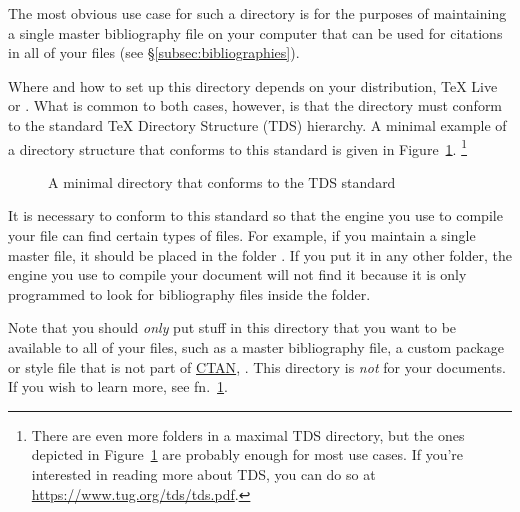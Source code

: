 The most obvious use case for such a directory is for the purposes of maintaining a single master bibliography file on your computer that can be used for citations in all of your  files (see \S\ref{subsec:bibliographies}).

Where and how to set up this directory depends on your distribution, TeX Live or .
What is common to both cases, however, is that the directory must conform to the standard \TeX{} Directory Structure (TDS) hierarchy.
A minimal example of a directory structure that conforms to this standard is given in Figure~\ref{fig:TDS}.%
\footnote{%
\label{fn:TDS}
There are even more folders in a maximal TDS directory, but the ones depicted in Figure~\ref{fig:TDS} are probably enough for most use cases.
If you're interested in reading more about TDS, you can do so at \url{https://www.tug.org/tds/tds.pdf}.%
}

\begin{figure}[htbp]
	\centering
	\caption{A minimal directory that conforms to the TDS standard}
	\label{fig:TDS}
\end{figure}

It is necessary to conform to this standard so that the engine you use to compile your  file can find certain types of files.
For example, if you maintain a single master  file, it should be placed in the folder .
If you put it in any other folder, the engine you use to compile your document will not find it because it is only programmed to look for bibliography files inside the  folder.

Note that you should \emph{only} put stuff in this directory that you want to be available to all of your  files, such as a master bibliography file, a custom package or style file that is not part of \href{http://ctan.org/}{CTAN}, \ETC.
This directory is \emph{not} for your  documents.
If you wish to learn more, see fn.~\ref{fn:TDS}.

